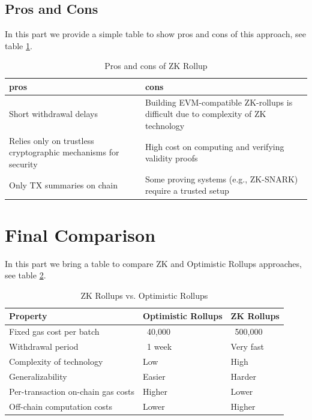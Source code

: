 \subsection{Pros and Cons}
In this part we provide a simple table to show pros and cons of this approach, see table \ref{table:L14_t2}.
\begin{table}[htbp]
	\centering
	\captionsetup{justification=centering}
	\caption[position=above]{Pros and cons of ZK Rollup}
	\begin{tabular}{|>{\centering\arraybackslash}p{4cm}|>{\centering\arraybackslash}p{4cm}|}
		\hline
		\textbf{pros} & \textbf{cons}\\
		\hline
		Short withdrawal delays	& Building EVM-compatible ZK-rollups is difficult due to complexity of ZK technology \\
		\hline
		Relies only on trustless cryptographic mechanisms for security & High cost on computing and verifying validity proofs \\
		\hline
		Only TX summaries on chain & Some proving systems (e.g., ZK-SNARK) require a trusted setup \\
		\hline
	\end{tabular}
	\label{table:L14_t2}
\end{table}
\section{Final Comparison}
In this part we bring a table to compare ZK and Optimistic Rollups approaches, see table \ref{table:L14_t3}.
\begin{table}[htbp]
	\centering
	\captionsetup{justification=centering}
	\caption[position=above]{ZK Rollups vs. Optimistic Rollups}
	\begin{tabular}{|>{\centering\arraybackslash}p{4cm}|>{\centering\arraybackslash}p{4cm}|>{\centering\arraybackslash}p{4cm}|}
		\hline
		\textbf{Property} & \textbf{Optimistic Rollups} & \textbf{ZK Rollups}\\
		\hline
		Fixed gas cost per batch & ~40,000 & ~500,000\\
		\hline
		Withdrawal period & ~1 week & Very fast \\
		\hline
		Complexity of technology & Low & High \\
		\hline
		Generalizability & Easier & Harder \\
		\hline
		Per-transaction on-chain gas costs & Higher & Lower \\
		\hline
		Off-chain computation costs & Lower & Higher \\
		\hline
	\end{tabular}
	\label{table:L14_t3}
\end{table}